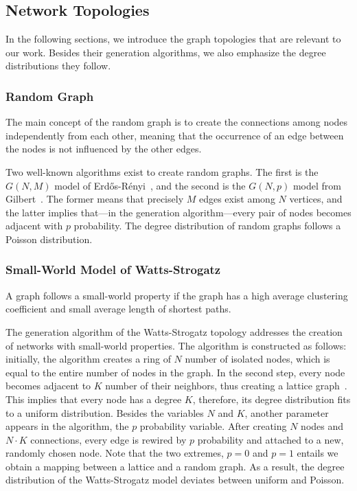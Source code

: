 \subsection{Network Topologies} \label{sec:topologies}

In the following sections, we introduce the graph topologies that are relevant to our work. Besides their generation algorithms, we also emphasize the degree distributions they follow.

\subsubsection{Random Graph}

The main concept of the random graph is to create the connections among nodes independently from each other, meaning that the occurrence of an edge between the nodes is not influenced by the other edges. 

Two well-known algorithms exist to create random graphs. The first is the $G(N, M)$ model of Erdős-Rényi~\cite{erdos_random}, and the second is the $G(N,p)$ model from Gilbert~\cite{gilbert_random}. The former means that precisely $M$ edges exist among $N$ vertices, and the latter implies that---in the generation algorithm---every pair of nodes becomes adjacent with $p$ probability. The degree distribution of random graphs follows a Poisson distribution.

\subsubsection{Small-World Model of Watts-Strogatz}

A graph follows a small-world property if the graph has a high average clustering coefficient and small average length of shortest paths.

The generation algorithm of the Watts-Strogatz topology addresses the creation of networks with small-world properties. The algorithm is constructed as follows: initially, the algorithm creates a ring of $N$ number of isolated nodes, which is equal to the entire number of nodes in the graph. In the second step, every node becomes adjacent to $K$ number of their neighbors, thus creating a lattice graph~\cite{lattice}. This implies that every node has a degree $K$, therefore, its degree distribution fits to a uniform distribution. Besides the variables $N$ and $K$, another parameter appears in the algorithm, the $p$ probability variable. After creating $N$ nodes and $N \cdot K$ connections, every edge is rewired by $p$ probability and attached to a new, randomly chosen node. Note that the two extremes, $p=0$ and $p=1$ entails we obtain a mapping between a lattice and a random graph. As a result, the degree distribution of the Watts-Strogatz model deviates between uniform and Poisson.

